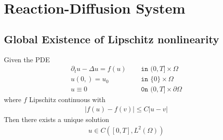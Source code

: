 \section{Reaction-Diffusion System}
\subsection{Global Existence of Lipschitz nonlinearity}
\begin{theorem}
Given the PDE
\begin{align*}
	\partial_t u - \Delta u = f(u) \quad &\texttt{ in } (0, T] \times \Omega\\
	u(0, ) = u_0 \quad &\texttt{ in } \{0\} \times \Omega\\
	u \equiv 0 \quad &\texttt{ 0n } (0, T] \times \partial\Omega
\end{align*}
where $f$ Lipschitz continuous with
\begin{align*}
	|f(u) - f(v)| \le C |u - v|
\end{align*}
Then there exists a unique solution 
\begin{align*}
	u \in C([0, T], L^2(\Omega))
\end{align*}
\end{theorem}
